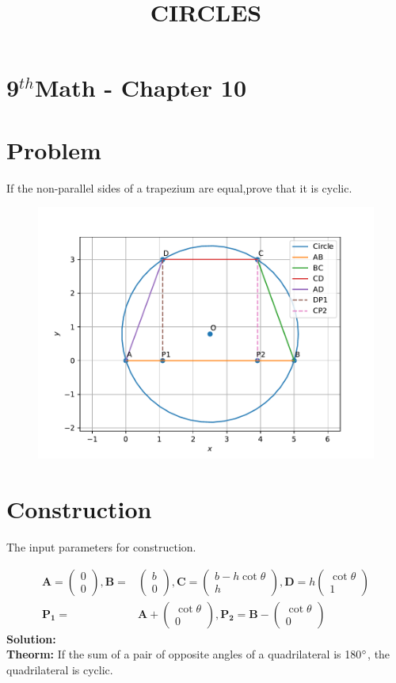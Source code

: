 \documentclass[10pt]{article}
\newcommand{\solution}{\noindent \textbf{Solution: }}
\newcommand{\myvec}[1]{\ensuremath{\begin{pmatrix}#1\end{pmatrix}}}
\let\vec\mathbf{}
\begin{document}
\begin{center}
\title{\textbf{CIRCLES}}
\date{\vspace{-5ex}}
\maketitle
\end{center}
\section*{9$^{th}$Math - Chapter 10}
\section*{Problem}
If the  non-parallel sides of a trapezium are equal,prove that it is cyclic.
\begin{figure}[!h]
	\begin{center}
	\includegraphics[width=\columnwidth]{./figs/fig.pdf}
	\end{center}
\caption{}
\label{fig:1}
\end{figure}
\section*{Construction}
The input parameters for construction.\\

\begin{table}[!h]
\centering

\label{tab:1}
\end{table}
\begin{align}
\vec{A}=\myvec{0\\0},
\vec{B}=&\myvec{b\\0},
\vec{C}=\myvec{b-h\cot\theta\\h},
\vec{D}=h\myvec{\cot\theta\\1}\\
\vec{P_1}=&\vec{A}+\myvec{\cot\theta\\0},
\vec{P_2}=\vec{B}-\myvec{\cot\theta\\0}
\end{align}
\solution\\
\textbf{Theorm:}
If the sum of a pair of opposite angles of a quadrilateral is
180$\degree$, the quadrilateral is cyclic.\\
\end{document}
